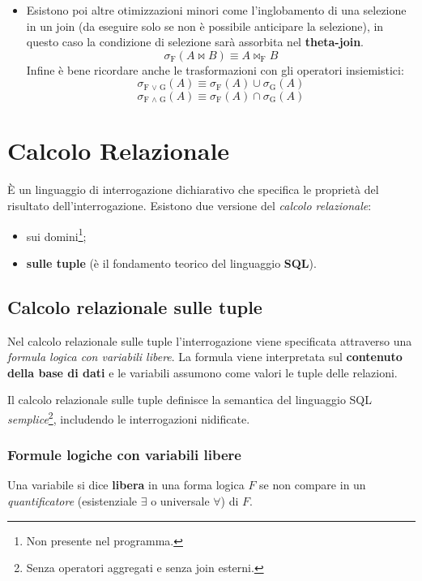 \documentclass{report}
\begin{document}
\begin{itemize}
    \item Esistono poi altre otimizzazioni minori come l'inglobamento di una selezione in un join (da eseguire solo se non è possibile anticipare la selezione), in questo caso la condizione di selezione sarà assorbita nel \textbf{theta-join}.\\
$$\sigma_\text{F}(A \bowtie B) \equiv A \bowtie_\text{F} B$$
    Infine è bene ricordare anche le trasformazioni con gli operatori insiemistici:\\
$$\sigma_\text{F $\vee$ G}(A) \equiv \sigma_\text{F}(A) \cup \sigma_\text{G}(A)$$
$$\sigma_\text{F $\wedge$ G}(A) \equiv \sigma_\text{F}(A) \cap \sigma_\text{G}(A)$$
    
\end{itemize}

\newpage
\chapter{Calcolo Relazionale}

\`E un linguaggio di interrogazione dichiarativo che specifica le propriet\`a del risultato dell'interrogazione. Esistono due versione del \emph{calcolo relazionale}:
\begin{itemize}
	\item sui domini\footnote{Non presente nel programma.};
	\item \textbf{sulle tuple} (\`e il fondamento teorico del linguaggio \textbf{SQL}).
\end{itemize}

\section{Calcolo relazionale sulle tuple}

Nel calcolo relazionale sulle tuple l'interrogazione viene specificata attraverso una \emph{formula logica con variabili libere}. La formula viene interpretata sul \textbf{contenuto della base di dati} e le variabili assumono come valori le tuple delle relazioni.

Il calcolo relazionale sulle tuple definisce la semantica del linguaggio SQL \emph{semplice}\footnote{Senza operatori aggregati e senza join esterni.}, includendo le interrogazioni nidificate.

\subsection{Formule logiche con variabili libere}
Una variabile si dice \textbf{libera} in una forma logica $F$ se non compare in un \emph{quantificatore} (esistenziale $\exists$ o universale $\forall$) di $F$.
\end{document}
